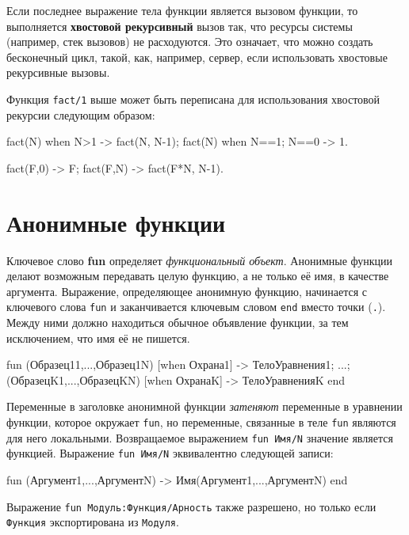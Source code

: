 Если последнее выражение тела функции является вызовом функции, то выполняется
\textbf{хвостовой рекурсивный} вызов так, что ресурсы системы (например, стек
вызовов) не расходуются. Это означает, что можно создать бесконечный цикл, 
такой, как, например, сервер, если использовать хвостовые рекурсивные вызовы.

Функция \texttt{fact/1} выше может быть переписана для использования хвостовой
рекурсии следующим образом:

 \begin{erlang}
fact(N) when N>1 -> fact(N, N-1);
fact(N) when N==1; N==0 -> 1.

fact(F,0) -> F;       %
fact(F,N) -> fact(F*N, N-1).
\end{erlang}



\section{Анонимные функции}
\label{functions:funs}

Ключевое слово \textbf{fun} определяет \emph{функциональный объект}. Анонимные 
функции делают возможным передавать целую функцию, а не только её имя, в 
качестве аргумента. Выражение, определяющее анонимную функцию, начинается с
ключевого слова \texttt{fun} и заканчивается ключевым словом \texttt{end}
вместо точки (\texttt{.}).  Между ними должно находиться обычное объявление
функции, за тем исключением, что имя её не пишется.

\begin{erlangru}
fun
    (Образец11,...,Образец1N) [when Охрана1] ->
        ТелоУравнения1;
        ...;
    (ОбразецK1,...,ОбразецKN) [when ОхранаK] ->
        ТелоУравненияK
end
\end{erlangru}

Переменные в заголовке анонимной функции \emph{затеняют} переменные в уравнении
функции, которое окружает \texttt{fun}, но переменные, связанные в теле 
\texttt{fun} являются для него локальными.  Возвращаемое выражением \texttt{fun 
Имя/N} значение является функцией. Выражение \texttt{fun Имя/N} эквивалентно 
следующей записи:

\begin{erlangru}
fun (Аргумент1,...,АргументN) -> Имя(Аргумент1,...,АргументN) end
\end{erlangru}

Выражение \texttt{fun Модуль:Функция/Арность} также разрешено, но только если 
\texttt{Функция} экспортирована из \texttt{Модуля}.

